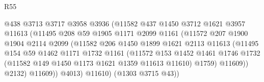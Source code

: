\begin{lexlean}{R55}
\begin{coremodule}
                                    @438
                                    @3713
                                    @3717
                                    @3958
                                    @3936
                                    (@11582
                                      @437
                                      @1450
                                      @3712
                                      @1621
                                      @3957
                                      @11613
                                      (@11495
                                        @208
                                        @59
                                        @1905
                                        @1171
                                        @2099
                                        @1161
                                        (@11572
                                          @207
                                          @1900
                                          @1904
                                          @2114
                                          @2099
                                          (@11582
                                            @206
                                            @1450
                                            @1899
                                            @1621
                                            @2113
                                            @11613
                                            (@11495
                                              @154
                                              @59
                                              @1462
                                              @1171
                                              @1732
                                              @1161
                                              (@11572
                                                @153
                                                @1452
                                                @1461
                                                @1746
                                                @1732
                                                (@11582 @149 @1450 @1173 @1621 @1359 @11613 @11610)
                                                @1759)
                                              @11609))
                                          @2132)
                                        @11609))
                                    @4013)
                                  @11610)
                                (@1303 @3715 @43))

\end{coremodule}
\end{lexlean}
